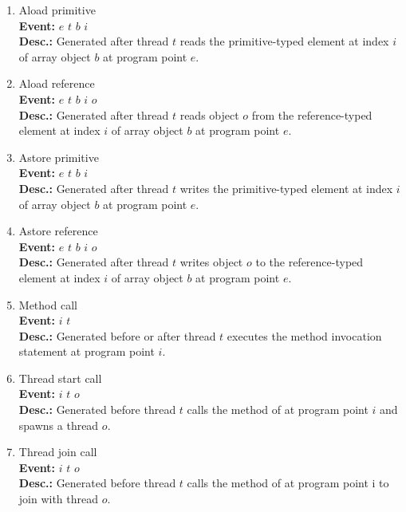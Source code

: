 \begin{enumerate}
\item
Aload primitive \\
{\bf Event:}  $e$ $t$ $b$ $i$ \\
{\bf Desc.:} Generated after thread $t$ reads the primitive-typed element at index $i$ of array object $b$ at program point $e$.

\item
Aload reference \\
{\bf Event:}  $e$ $t$ $b$ $i$ $o$ \\
{\bf Desc.:} Generated after thread $t$ reads object $o$ from the reference-typed element at index $i$ of array object $b$ at program point $e$.

\item
Astore primitive \\
{\bf Event:}  $e$ $t$ $b$ $i$ \\
{\bf Desc.:} Generated after thread $t$ writes the primitive-typed element at index $i$ of array object $b$ at program point $e$.

\item
Astore reference \\
{\bf Event:}  $e$ $t$ $b$ $i$ $o$ \\
{\bf Desc.:} Generated after thread $t$ writes object $o$ to the reference-typed element at index $i$ of array object $b$ at program point $e$.

\item
Method call \\
{\bf Event:}  $i$ $t$ \\
{\bf Desc.:} Generated before or after thread $t$ executes the method invocation statement at program point $i$.

\item
Thread start call \\
{\bf Event:}  $i$ $t$ $o$ \\
{\bf Desc.:} Generated before thread $t$ calls the  method of  at program point $i$ and spawns a thread $o$. 

\item
Thread join call \\
{\bf Event:}  $i$ $t$ $o$ \\
{\bf Desc.:} Generated before thread $t$ calls the  method of  at program point i to join with thread $o$.


\end{enumerate}
